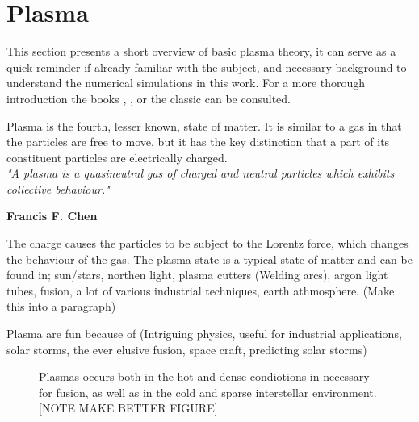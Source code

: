 \section{Plasma}
	\label{sec:plasma}
	This section presents a short overview of basic plasma theory, it can serve as a
	quick reminder if already familiar with the subject, and necessary
	background to understand the numerical simulations in this work.
	For a more thorough introduction the books \textit{}
    \citep{fitzpatrick_plasma_2014}, \textit{} \citep{goldston_introduction_1995},
    \textit{} \citep{pecseli_waves_2012} or the classic
    \textit{} \citep{chen_introduction_1984} can be consulted.

	Plasma is the fourth, lesser known, state of matter. It is similar to a gas
	in that the particles are free to move, but it has the key distinction that
	a part of its constituent particles are electrically charged.
	\\[1.0cm]
	\indent \textit{\large"A plasma is a quasineutral gas of charged and neutral particles which exhibits
	collective behaviour."}
	\begin{flushright}
	    \textbf{Francis F. Chen}\\[1.0cm]
	\end{flushright}
	The charge causes the particles to be subject to the Lorentz force, which
	changes the behaviour of the gas. The plasma state is a typical state of matter
	and can be found in;
	sun/stars, northen light, plasma cutters (Welding arcs), argon light tubes, fusion, a lot of various
	industrial techniques, earth athmosphere. (Make this into a paragraph)

	Plasma are fun because of (Intriguing physics, useful for industrial applications,
	solar storms, the ever elusive fusion, space craft, predicting solar storms)

	\begin{figure}
		\begin{center}
		\end{center}
		\caption{Plasmas occurs both in the hot and dense condiotions in necessary for fusion, as
		well as in the cold and sparse interstellar environment. [NOTE MAKE BETTER FIGURE]
		}
	\end{figure}



